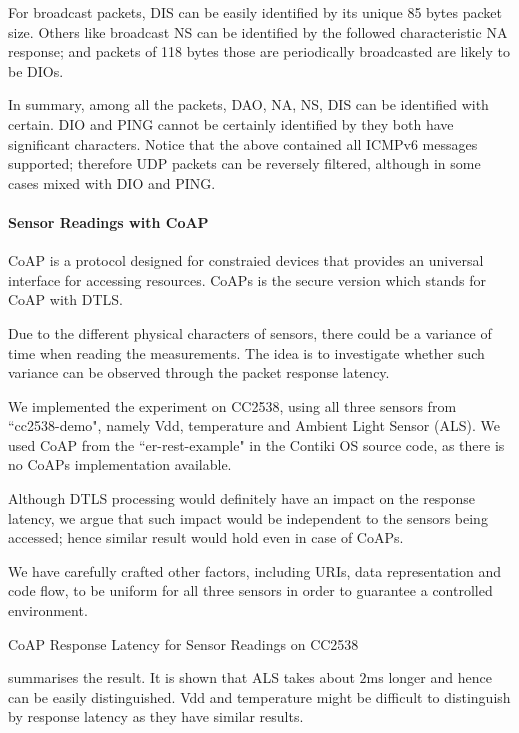 For broadcast packets, DIS can be easily identified by its unique 85 bytes packet size. Others like broadcast NS can be identified by the followed characteristic NA response; and packets of 118 bytes those are periodically broadcasted are likely to be DIOs.

In summary, among all the packets, DAO, NA, NS, DIS can be identified with certain. DIO and PING cannot be certainly identified by they both have significant characters. Notice that the above contained all ICMPv6 messages supported; therefore UDP packets can be reversely filtered, although in some cases mixed with DIO and PING.

\paragraph{Sensor Readings with CoAP}

CoAP\cite{rfc7252} is a protocol designed for constraied devices that provides an universal interface for accessing resources. CoAPs is the secure version which stands for CoAP with DTLS.

Due to the different physical characters of sensors, there could be a variance of time when reading the measurements. The idea is to investigate whether such variance can be observed through the packet response latency.

We implemented the experiment on CC2538, using all three sensors from ``cc2538-demo", namely Vdd, temperature and Ambient Light Sensor (ALS). We used CoAP from the ``er-rest-example" in the Contiki OS source code, as there is no CoAPs implementation available. 

Although DTLS processing would definitely have an impact on the response latency, we argue that such impact would be independent to the sensors being accessed; hence similar result would hold even in case of CoAPs.

We have carefully crafted other factors, including URIs, data representation and code flow, to be uniform for all three sensors in order to guarantee a controlled environment.

\begin{table}
	\center
	
	\caption{CoAP Response Latency for Sensor Readings on CC2538\label{CoapTiming}}
\end{table}

 summarises the result. It is shown that ALS takes about $2$ms longer and hence can be easily distinguished. Vdd and temperature might be difficult to distinguish by response latency as they have similar results.

